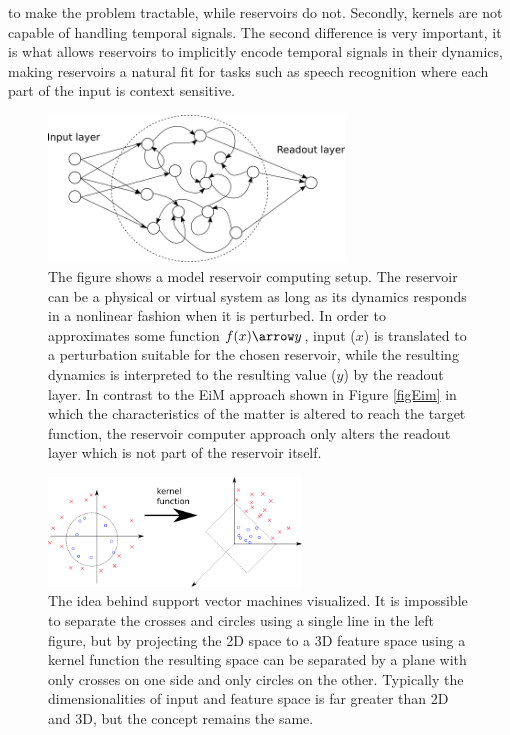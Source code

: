 to make the problem tractable, while reservoirs do not.
Secondly, kernels are not capable of handling temporal signals.
The second difference is very important, it is what allows reservoirs to
implicitly encode temporal signals in their dynamics, making reservoirs a
natural fit for tasks such as speech recognition where each part of the input is
context sensitive.
\begin{figure}[h!]
  \centering
  \includegraphics[width=0.7\textwidth]{fig/reservoirz.png}
  \caption{
    The figure shows a model reservoir computing setup.
    The reservoir can be a physical or virtual system as long as its dynamics
    responds in a nonlinear fashion when it is perturbed. 
    In order to approximates some function $f(x) \arrow y$, input ($x$) is
    translated to a perturbation suitable for the chosen reservoir, while the
    resulting dynamics is interpreted to the resulting value ($y$) by the
    readout layer.
    In contrast to the EiM approach shown in Figure \ref{figEim} in which the
    characteristics of the matter is altered to reach the target function, the
    reservoir computer approach only alters the readout layer which is not part
    of the reservoir itself.
  }
  \label{figRC}
\end{figure}
\begin{figure}[h!]
  \centering
  \includegraphics[width=0.6\textwidth]{fig/svmthing.png}
  \caption{
    The idea behind support vector machines visualized.
    It is impossible to separate the crosses and circles using a single line in
    the left figure, but by projecting the 2D space to a 3D feature space using
    a kernel function the resulting space can be separated by a plane with only
    crosses on one side and only circles on the other.
    Typically the dimensionalities of input and feature space is far greater
    than 2D and 3D, but the concept remains the same.
  }
  \label{figSVM}
\end{figure}
